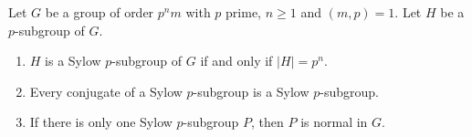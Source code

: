 Let $G$ be a group of order $p^n m$ with $p$ prime, $n \geq 1$ and $(m,p) = 1$. Let $H$ be a $p$-subgroup of $G$.
\begin{enumerate}
\item[(i)] $H$ is a Sylow $p$-subgroup of $G$ if and only if $|H| = p^n$.
\item[(ii)] Every conjugate of a Sylow $p$-subgroup is a Sylow $p$-subgroup.
\item[(iii)] If there is only one Sylow $p$-subgroup $P$, then $P$ is normal in $G$.
\end{enumerate}
